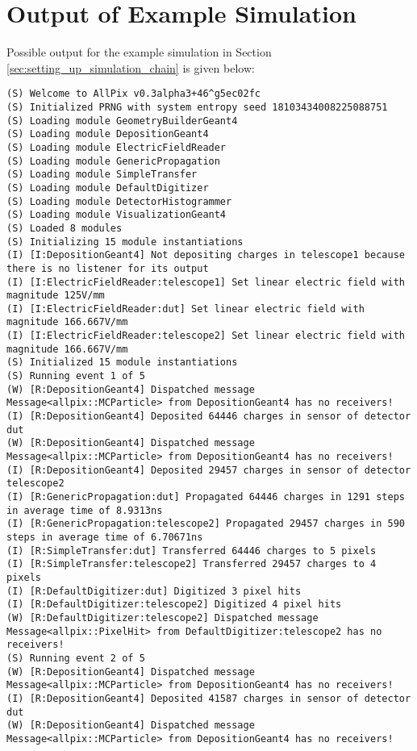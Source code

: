 \section{Output of Example Simulation}
\label{sec:example_output}
Possible output for the example simulation in Section \ref{sec:setting_up_simulation_chain} is given below:

\begin{lstlisting}[breaklines]
(S) Welcome to AllPix v0.3alpha3+46^g5ec02fc
(S) Initialized PRNG with system entropy seed 18103434008225088751
(S) Loading module GeometryBuilderGeant4
(S) Loading module DepositionGeant4     
(S) Loading module ElectricFieldReader
(S) Loading module GenericPropagation  
(S) Loading module SimpleTransfer     
(S) Loading module DefaultDigitizer
(S) Loading module DetectorHistogrammer
(S) Loading module VisualizationGeant4  
(S) Loaded 8 modules                   
(S) Initializing 15 module instantiations
(I) [I:DepositionGeant4] Not depositing charges in telescope1 because there is no listener for its output
(I) [I:ElectricFieldReader:telescope1] Set linear electric field with magnitude 125V/mm
(I) [I:ElectricFieldReader:dut] Set linear electric field with magnitude 166.667V/mm
(I) [I:ElectricFieldReader:telescope2] Set linear electric field with magnitude 166.667V/mm
(S) Initialized 15 module instantiations
(S) Running event 1 of 5
(W) [R:DepositionGeant4] Dispatched message Message<allpix::MCParticle> from DepositionGeant4 has no receivers!
(I) [R:DepositionGeant4] Deposited 64446 charges in sensor of detector dut
(W) [R:DepositionGeant4] Dispatched message Message<allpix::MCParticle> from DepositionGeant4 has no receivers!
(I) [R:DepositionGeant4] Deposited 29457 charges in sensor of detector telescope2
(I) [R:GenericPropagation:dut] Propagated 64446 charges in 1291 steps in average time of 8.9313ns
(I) [R:GenericPropagation:telescope2] Propagated 29457 charges in 590 steps in average time of 6.70671ns
(I) [R:SimpleTransfer:dut] Transferred 64446 charges to 5 pixels
(I) [R:SimpleTransfer:telescope2] Transferred 29457 charges to 4 pixels
(I) [R:DefaultDigitizer:dut] Digitized 3 pixel hits
(I) [R:DefaultDigitizer:telescope2] Digitized 4 pixel hits
(W) [R:DefaultDigitizer:telescope2] Dispatched message Message<allpix::PixelHit> from DefaultDigitizer:telescope2 has no receivers!
(S) Running event 2 of 5
(W) [R:DepositionGeant4] Dispatched message Message<allpix::MCParticle> from DepositionGeant4 has no receivers!
(I) [R:DepositionGeant4] Deposited 41587 charges in sensor of detector dut
(W) [R:DepositionGeant4] Dispatched message Message<allpix::MCParticle> from DepositionGeant4 has no receivers!

\end{lstlisting}
